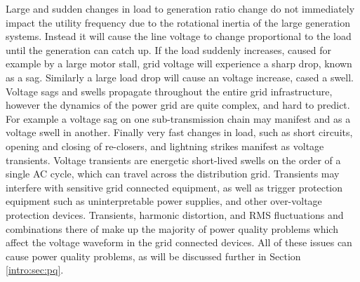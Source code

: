 Large and sudden changes in load to generation ratio change do not immediately impact the utility frequency due to the rotational inertia of the large generation systems. Instead it will cause the line voltage to change proportional to the load until the generation can catch up. If the load suddenly increases, caused for example by a large motor stall, grid voltage will experience a sharp drop, known as a sag. Similarly a large load drop will cause an voltage increase, cased a swell. Voltage sags and swells propagate throughout the entire grid infrastructure, however the dynamics of the power grid are quite complex, and hard to predict. For example a voltage sag on one sub-transmission chain may manifest and as a voltage swell in another. Finally very fast changes in load, such as short circuits, opening and closing of re-closers, and lightning strikes manifest as voltage transients. Voltage transients are energetic short-lived swells on the order of a single AC cycle, which can travel across the distribution grid. Transients may interfere with sensitive grid connected equipment, as well as trigger protection equipment such as uninterpretable power supplies, and other over-voltage protection devices. Transients, harmonic distortion, and RMS fluctuations and combinations there of make up the majority of power quality problems which affect the voltage waveform in the grid connected devices. \cite{5154067} All of these issues can cause power quality problems, as will be discussed further in Section \ref{intro:sec:pq}.

